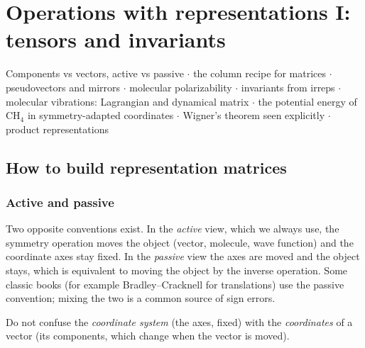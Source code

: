 \chapter{Operations with representations I: tensors and invariants}\label{ch:ops1}

\begin{watch}{}
Components vs vectors, active vs passive  $\cdot$
the column recipe for matrices  $\cdot$
pseudovectors and mirrors  $\cdot$
molecular polarizability  $\cdot$
invariants from irreps  $\cdot$
molecular vibrations: Lagrangian and dynamical matrix  $\cdot$
the potential energy of $\mathrm{CH_4}$ in symmetry-adapted coordinates  $\cdot$
Wigner's theorem seen explicitly  $\cdot$
product representations 
\end{watch}

\section{How to build representation matrices}\label{sec:active}

\subsection{Active and passive}
Two opposite conventions exist. In the \emph{active} view, which we always use, the
symmetry operation moves the object (vector, molecule, wave function) and the
coordinate axes stay fixed. In the \emph{passive} view the axes are moved and the
object stays, which is equivalent to moving the object by the inverse operation.
Some classic books (for example Bradley--Cracknell for translations) use the passive
convention; mixing the two is a common source of sign errors.

Do not confuse the \emph{coordinate system} (the axes, fixed) with the
\emph{coordinates} of a vector (its components, which change when the vector is
moved).

